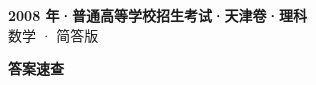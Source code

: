 \documentclass[zihao=-4, a4paper]{ctexart}
\begin{document}
\begin{center}
  {\Large\bfseries 2008 年·普通高等学校招生考试·天津卷·理科}\\[4pt]
  {\large 数学 · 简答版}
\end{center}
\medskip
{}

\clearpage
{}
\begin{center}{\Large\bfseries 答案速查}\end{center}
\medskip

\end{document}
